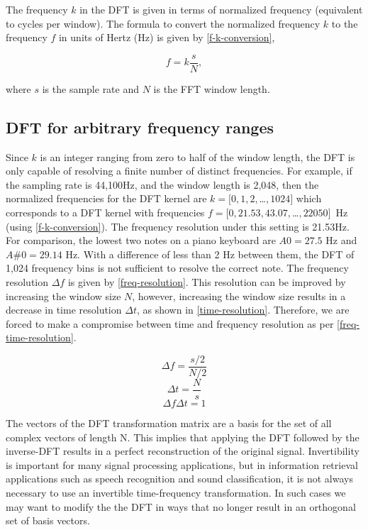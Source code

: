 \documentclass{ieeeaccess}
\begin{document}
The frequency $k$ in the DFT is given in terms of normalized frequency (equivalent to cycles per window). The formula to convert the normalized frequency $k$ to the frequency $f$ in units of Hertz (Hz) is given by \eqref{f-k-conversion},

\begin{equation}
 f= k\frac{s}{N} \label{f-k-conversion},
\end{equation}

where $s$ is the sample rate and $N$ is the FFT window length.



\subsection{DFT for arbitrary frequency ranges}
Since $k$ is an integer ranging from zero to half of the window length, the DFT is only capable of resolving a finite number of distinct frequencies. For example, if the sampling rate is 44,100Hz, and the window length is 2,048, then the normalized frequencies for the DFT kernel are $k=[0,1,2,$\ldots$,1024]$ which corresponds to a DFT kernel with frequencies  $f=[0,21.53,43.07,$\ldots$, 22050]$~Hz (using \eqref{f-k-conversion}).  The frequency resolution under this setting is 21.53Hz. For comparison, the lowest two notes on a piano keyboard are $A0=27.5$ Hz and $A\#0=29.14$ Hz. With a difference of less than 2 Hz between them, the DFT of 1,024 frequency bins is not sufficient to resolve the correct note. The frequency resolution $\Delta f$ is given by \eqref{freq-resolution}. This resolution can be improved by increasing the window size $N$, however, increasing the window size results in a decrease in time resolution $\Delta t$, as shown in \eqref{time-resolution}. Therefore, we are forced to make a compromise between time and frequency resolution as per \eqref{freq-time-resolution}.

\begin{equation}
 \Delta f = \frac{s/2}{N/2} \label{freq-resolution}
\end{equation}
\begin{equation}
 \Delta t = \frac{N}{s} \label{time-resolution}
\end{equation}
\begin{equation}
 \Delta f\Delta t = 1 \label{freq-time-resolution}
\end{equation}


The vectors of the DFT transformation matrix are a basis for the set of all complex vectors of length N. This implies that applying the DFT followed by the inverse-DFT results in a perfect reconstruction of the original signal. Invertibility is important for many signal processing applications, but in information retrieval applications such as speech recognition and sound classification, it is not always necessary to use an invertible time-frequency transformation. In such cases we may want to modify the the DFT in ways that no longer result in an orthogonal set of basis vectors.
\end{document}
